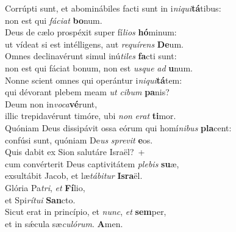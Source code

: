 \evenverse Corrúpti sunt, et abominábiles facti sunt in i\textit{ni}\textit{qui}\textbf{tá}tibus:~\*\\
\evenverse non est qui \textit{fá}\textit{ci}\textit{at} \textbf{bo}num.\\
\oddverse Deus de cælo prospéxit super fí\textit{li}\textit{os} \textbf{hó}minum:~\*\\
\oddverse ut vídeat si est intélligens, aut \textit{re}\textit{quí}\textit{rens} \textbf{De}um.\\
\evenverse Omnes declinavérunt simul inú\textit{ti}\textit{les} \textbf{fa}cti sunt:~\*\\
\evenverse non est qui fáciat bonum, non est \textit{us}\textit{que} \textit{ad} \textbf{u}num.\\
\oddverse Nonne scient omnes qui operántur i\textit{ni}\textit{qui}\textbf{tá}tem:~\*\\
\oddverse qui dévorant plebem meam \textit{ut} \textit{ci}\textit{bum} \textbf{pa}nis?\\
\evenverse Deum non in\textit{vo}\textit{ca}\textbf{vé}runt,~\*\\
\evenverse illic trepidavérunt timóre, ubi \textit{non} \textit{e}\textit{rat} \textbf{ti}mor.\\
\oddverse Quóniam Deus dissipávit ossa eórum qui homí\textit{ni}\textit{bus} \textbf{pla}cent:~\*\\
\oddverse confúsi sunt, quóniam De\textit{us} \textit{spre}\textit{vit} \textbf{e}os.\\
\evenverse Quis dabit ex Sion salutáre Israël?~+\\
\evenverse  cum convérterit Deus captivitátem \textit{ple}\textit{bis} \textbf{su}æ,~\*\\
\evenverse exsultábit Jacob, et læ\textit{tá}\textit{bi}\textit{tur} \textbf{Is}\textbf{ra}ël.\\
\oddverse Glória Pa\textit{tri}, \textit{et} \textbf{Fí}lio,~\*\\
\oddverse et Spi\textit{rí}\textit{tu}\textit{i} \textbf{San}cto.\\
\evenverse Sicut erat in princípio, et \textit{nunc}, \textit{et} \textbf{sem}per,~\*\\
\evenverse et in sǽcula sæ\textit{cu}\textit{ló}\textit{rum}. \textbf{A}men.\\
